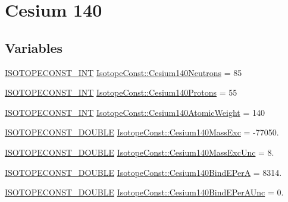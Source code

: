\hypertarget{group___isotope_const-_cesium-_cs140}{}\section{Cesium 140}
\label{group___isotope_const-_cesium-_cs140}
\subsection*{Variables}
\begin{DoxyCompactItemize}
\item 
\mbox{\hyperlink{group___isotope_const-_macros_ga5f18360b3e99483a35c32d789e62621c}{I\+S\+O\+T\+O\+P\+E\+C\+O\+N\+S\+T\+\_\+\+I\+NT}} \mbox{\hyperlink{group___isotope_const-_cesium-_cs140_ga8377eaab47f517d53786aca6b349ace2}{Isotope\+Const\+::\+Cesium140\+Neutrons}} = 85
\item 
\mbox{\hyperlink{group___isotope_const-_macros_ga5f18360b3e99483a35c32d789e62621c}{I\+S\+O\+T\+O\+P\+E\+C\+O\+N\+S\+T\+\_\+\+I\+NT}} \mbox{\hyperlink{group___isotope_const-_cesium-_cs140_gad4a6e45243003d8409ecd5ebd33a7c4f}{Isotope\+Const\+::\+Cesium140\+Protons}} = 55
\item 
\mbox{\hyperlink{group___isotope_const-_macros_ga5f18360b3e99483a35c32d789e62621c}{I\+S\+O\+T\+O\+P\+E\+C\+O\+N\+S\+T\+\_\+\+I\+NT}} \mbox{\hyperlink{group___isotope_const-_cesium-_cs140_ga3d7a2224cfb3d3ac23baa0d04511cccb}{Isotope\+Const\+::\+Cesium140\+Atomic\+Weight}} = 140
\item 
\mbox{\hyperlink{group___isotope_const-_macros_ga8f45a7272ce02c0b4c65c44636ed719a}{I\+S\+O\+T\+O\+P\+E\+C\+O\+N\+S\+T\+\_\+\+D\+O\+U\+B\+LE}} \mbox{\hyperlink{group___isotope_const-_cesium-_cs140_ga203c6fac2efbd5713f63a1fd1f63b3dd}{Isotope\+Const\+::\+Cesium140\+Mass\+Exc}} = -\/77050.
\item 
\mbox{\hyperlink{group___isotope_const-_macros_ga8f45a7272ce02c0b4c65c44636ed719a}{I\+S\+O\+T\+O\+P\+E\+C\+O\+N\+S\+T\+\_\+\+D\+O\+U\+B\+LE}} \mbox{\hyperlink{group___isotope_const-_cesium-_cs140_ga5ecd7ad0714c77532ffbe5cf794a797b}{Isotope\+Const\+::\+Cesium140\+Mass\+Exc\+Unc}} = 8.
\item 
\mbox{\hyperlink{group___isotope_const-_macros_ga8f45a7272ce02c0b4c65c44636ed719a}{I\+S\+O\+T\+O\+P\+E\+C\+O\+N\+S\+T\+\_\+\+D\+O\+U\+B\+LE}} \mbox{\hyperlink{group___isotope_const-_cesium-_cs140_ga8987e84b9b27cdf9665dbcacb0dc3e69}{Isotope\+Const\+::\+Cesium140\+Bind\+E\+PerA}} = 8314.
\item 
\mbox{\hyperlink{group___isotope_const-_macros_ga8f45a7272ce02c0b4c65c44636ed719a}{I\+S\+O\+T\+O\+P\+E\+C\+O\+N\+S\+T\+\_\+\+D\+O\+U\+B\+LE}} \mbox{\hyperlink{group___isotope_const-_cesium-_cs140_gaed907c747199a246279e825a156a7f87}{Isotope\+Const\+::\+Cesium140\+Bind\+E\+Per\+A\+Unc}} = 0.

\end{DoxyCompactItemize}
